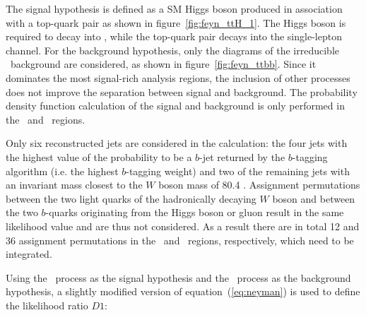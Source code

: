 The signal hypothesis is defined as a SM Higgs boson produced in association
with a top-quark pair as shown in figure~\ref{fig:feyn_ttH_1}. 
The Higgs boson is required to decay into \bbbar, while the top-quark pair decays 
into the single-lepton channel. 
For the background hypothesis, only the diagrams of the irreducible 
\ttbb\ background are considered, as shown in figure~\ref{fig:feyn_ttbb}. Since it dominates the most signal-rich analysis regions, 
the inclusion of other processes does not improve the separation 
between signal and background. 
The probability density function calculation of the signal and background is only performed in the \sixthree\ 
and \sixfour\ regions. 

Only six reconstructed 
jets are considered in the calculation: 
the four jets with the highest value of the probability to be a $b$-jet returned by the 
$b$-tagging algorithm (i.e. the highest $b$-tagging weight) 
and two of the remaining jets with an 
invariant mass closest to the $W$ boson mass of 80.4 \gev. 
Assignment permutations between the two light quarks of the hadronically decaying $W$ 
boson and between 
the two $b$-quarks originating from the Higgs boson or gluon result in the same 
likelihood value and are thus not considered.
As a result there are in total 12 and 36 assignment permutations in the \sixfour\ 
and \sixthree\ regions, respectively, which need to be integrated.

Using the \tth\ process as the signal hypothesis and the \ttbb\ process as the 
background hypothesis, a slightly modified version of equation~(\ref{eq:neyman}) is used to define 
the likelihood ratio $D1$:

